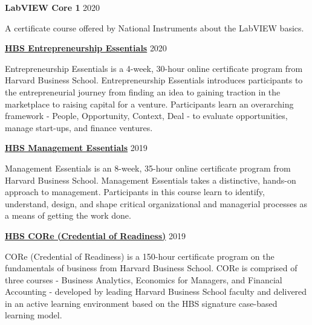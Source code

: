 \documentclass[margin,line]{res}
\begin{document}
\begin{resume}
\vspace*{-2mm}

{\bf LabVIEW Core 1} \hfill {2020}\\
\vspace*{-3.5mm}
\begin{addmargin}[0pt]{.1\linewidth}
\vspace*{-1mm}
A certificate course offered by National Instruments about the LabVIEW basics.
\end{addmargin}

\vspace*{-2mm}

{\bf \href{https://online.hbs.edu/courses/entrepreneurship-essentials/}{HBS Entrepreneurship Essentials}} \hfill {2020}\\
\vspace*{-3.5mm}
\begin{addmargin}[0pt]{.1\linewidth}
\vspace*{-1mm}
Entrepreneurship Essentials is a 4-week, 30-hour online certificate program from Harvard Business School. Entrepreneurship Essentials introduces participants to the entrepreneurial journey from finding an idea to gaining traction in the marketplace to raising capital for a venture. Participants learn an overarching framework - People, Opportunity, Context, Deal - to evaluate opportunities, manage start-ups, and finance ventures.
\end{addmargin}

\vspace*{-2mm}

{\bf \href{https://online.hbs.edu/courses/management-essentials/}{HBS Management Essentials}} \hfill {2019}\\
\vspace*{-3.5mm}
\begin{addmargin}[0pt]{.1\linewidth}
\vspace*{-1mm}
Management Essentials is an 8-week, 35-hour online certificate program from Harvard Business School. Management Essentials takes a distinctive, hands-on approach to management. Participants in this course learn to identify, understand, design, and shape critical organizational and managerial processes as a means of getting the work done.
\end{addmargin}

\vspace*{-2mm}

{\bf \href{https://online.hbs.edu/courses/core/}{HBS CORe (Credential of Readiness)}} \hfill {2019}\\
\vspace*{-3.5mm}
\begin{addmargin}[0pt]{.1\linewidth}
\vspace*{-1mm}
CORe (Credential of Readiness) is a 150-hour certificate program on the fundamentals of business from Harvard Business School. CORe is comprised of three courses - Business Analytics, Economics for Managers, and Financial Accounting - developed by leading Harvard Business School faculty and delivered in an active learning environment based on the HBS signature case-based learning model.
\end{addmargin}


\end{resume}
\end{document}
